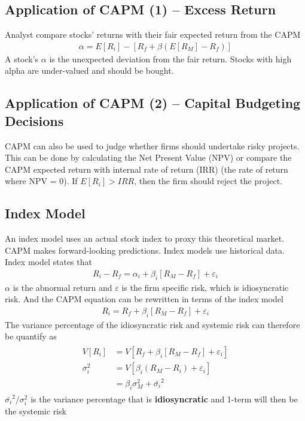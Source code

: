 \begin{multicols}{2}
\subsection{Application of CAPM (1) -- Excess Return}
Analyst compare stocks' returns with their fair expected return from the CAPM
\begin{gather*}
    \alpha = E[R_i]-[R_f+\beta(E[R_M]-R_f)]
\end{gather*}
A stock's $\alpha$ is the unexpected deviation from the fair return. Stocks with high alpha are under-valued and should be bought.

\subsection{Application of CAPM (2) -- Capital Budgeting Decisions}
CAPM can also be used to judge whether firms should undertake risky projects. This can be done by calculating the Net Present Value (NPV) or compare the CAPM expected return with internal rate of return (IRR) (the rate of return where NPV = 0). If $E[R_i]>IRR$, then the firm should reject the project. 

\subsection{Index Model}
An index model uses an actual stock index to proxy this theoretical market. CAPM makes forward-looking predictions. Index models use historical data. Index model states that
\begin{gather*}
    R_i-R_f = \alpha_i+\beta_i[R_M-R_f]+\varepsilon_i
\end{gather*} 
$\alpha$ is the abnormal return and $\varepsilon$ is the firm specific risk, which is idiosyncratic risk. And the CAPM equation can be rewritten in terms of the index model
\begin{gather*}
    \boxed{R_i = R_f+\beta_i[R_M-R_f]+\varepsilon_i}
\end{gather*}
The variance percentage of the idiosyncratic risk and systemic risk can therefore be quantify as 
\begin{gather*}
    \begin{split}
        V[R_i] &= V[R_f+\beta_i[R_M-R_f]+\varepsilon_i]\\
        \sigma_i^2 &= V[\beta_i(R_M-R_i)+\varepsilon_i]\\
        &= \beta_i\sigma_M^2 + \bar{\sigma_i}^2
    \end{split}
\end{gather*}
$\boxed{\bar{\sigma_i}^2/\sigma_i^2}$ is the variance percentage that is \textbf{idiosyncratic} and 1-term will then be the systemic risk








\end{multicols}